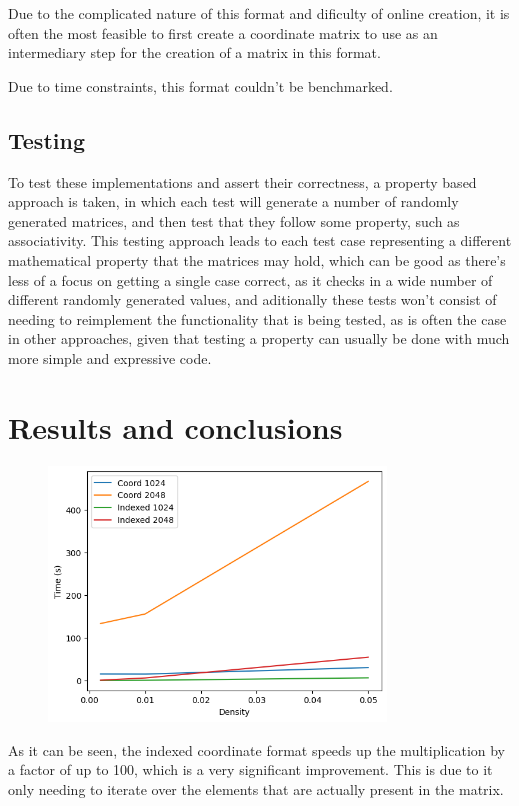 \documentclass{article}
\begin{document}
Due to the complicated nature of this format and dificulty of online creation, it is often the most feasible to
first create a coordinate matrix to use as an intermediary step for the creation of a matrix in this format.

Due to time constraints, this format couldn't be benchmarked.

\subsection{Testing}

To test these implementations and assert their correctness,
a property based approach is taken, in which each test will
generate a number of randomly generated matrices, and then test that they
follow some property, such as associativity.
This testing approach leads to each test case representing a different mathematical property that the matrices may hold,
which can be good as there's less of a focus on getting a single case correct, as it checks in a wide number of different randomly generated
values, and aditionally these tests won't consist of needing to reimplement the functionality that is being tested,
as is often the case in other approaches, given that testing a property can usually be done with much more simple and expressive code.

\section{Results and conclusions}

\begin{figure}[h!]
	\centering
	\includegraphics[width=0.8\textwidth]{plot.png}
\end{figure}

As it can be seen, the indexed coordinate format speeds up the multiplication by a factor of up to 100,
which is a very significant improvement.
This is due to it only needing to iterate over the elements that are actually present in the matrix.
\end{document}
